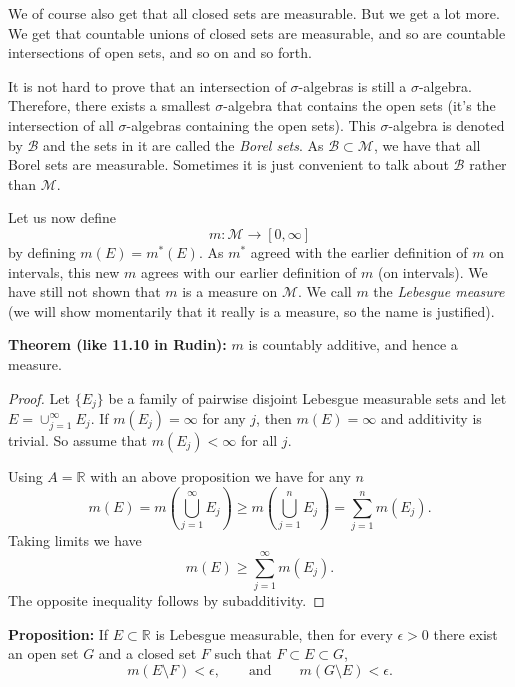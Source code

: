 \documentclass[12pt]{book}
\newcommand{\R}{{\mathbb{R}}}
\newcommand{\sB}{{\mathcal{B}}}
\newcommand{\sM}{{\mathcal{M}}}
\theoremstyle{plain}
\theoremstyle{remark}
\theoremstyle{definition}
\theoremstyle{exercise}
\theoremstyle{example}
\begin{document}
\medskip

We of course also get that all closed sets are measurable.  But we get a lot
more.  We get that countable unions of closed sets are measurable, and so are
countable intersections of open sets, and so on and so forth.

It is not hard to prove that an intersection of $\sigma$-algebras is
still a $\sigma$-algebra.  Therefore, there exists a smallest
$\sigma$-algebra that contains the open sets (it's the intersection of all
$\sigma$-algebras containing the open sets).  This $\sigma$-algebra
is denoted by $\sB$ and the sets in it are called
the \emph{Borel sets}.  As $\sB \subset \sM$, we have that all Borel sets
are measurable.  Sometimes it is just convenient to talk about
$\sB$ rather than $\sM$.

\medskip

Let us now define 
$$
m \colon \sM \to [0,\infty]
$$
by defining $m(E) = m^*(E)$.  As $m^*$ agreed with the earlier definition of
$m$ on intervals,
this new $m$ agrees with our earlier definition of $m$ (on intervals).
We have still not shown that $m$ is a measure on $\sM$.
We call $m$ the \emph{Lebesgue measure} (we will show momentarily that it
really is a measure, so the name is justified).

\medskip

\textbf{Theorem (like 11.10 in Rudin):}
$m$ is countably additive, and hence a measure.

\medskip

\begin{proof}
Let $\{E_j\}$ be a family of pairwise disjoint Lebesgue measurable sets
and let $E = \cup_{j=1}^\infty E_j$.
If $m(E_j) = \infty$ for any $j$, then $m(E) = \infty$ and additivity
is trivial.  So assume that
$m(E_j) < \infty$ for all $j$.

Using $A=\R$ with an above proposition we have for any $n$
$$
m( E)
=
m\left( \bigcup_{j=1}^\infty E_j  \right)
\geq
m\left( \bigcup_{j=1}^n E_j  \right)
=
\sum_{j=1}^n
m( E_j ) .
$$
Taking limits we have
$$
m( E)
\geq
\sum_{j=1}^\infty
m( E_j ) .
$$
The opposite inequality follows by subadditivity.
\end{proof}

\medskip

\textbf{Proposition:}
If $E \subset \R$ is Lebesgue measurable, then for every $\epsilon > 0$
there exist an open set $G$ and a closed set $F$
such that $F \subset E \subset G$,
$$
m(E \setminus F) < \epsilon , \qquad \text{and} \qquad
m(G \setminus E) < \epsilon .
$$
\end{document}
